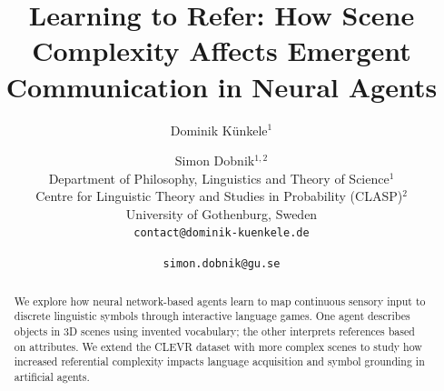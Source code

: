 \documentclass[11pt]{article}
\title{Learning to Refer: How Scene Complexity Affects Emergent Communication in Neural Agents}
\author{Dominik Künkele$^{1}$ \and Simon Dobnik$^{1,2}$ \\
        Department of Philosophy, Linguistics and Theory of Science$^{1}$ \\ 
        Centre for Linguistic Theory and Studies in Probability (CLASP)$^{2}$ \\
        University of Gothenburg, Sweden \\
        \texttt{contact@dominik-kuenkele.de} \and \texttt{simon.dobnik@gu.se}}
\def\tightlist{} %
\begin{document}
\maketitle
\begin{abstract}
  We explore how neural network-based agents learn to map continuous sensory input to discrete linguistic symbols through interactive language games.
  One agent describes objects in 3D scenes using invented vocabulary; the other interprets references based on attributes.
  We extend the CLEVR dataset with more complex scenes to study how increased referential complexity impacts language acquisition and symbol grounding in artificial agents.
\end{abstract}







\end{document}
